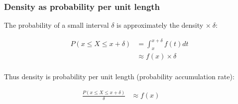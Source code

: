 \documentclass{beamer}
\begin{document}
\begin{frame}
\frametitle{Density as probability per unit length}

The probability of a small interval $\delta$ is approximately the density
$\times \ \delta$:

\vspace{-0.3cm}

\begin{align*}
P(x \leq X \leq x + \delta) &= \int_x^{x+\delta} f(t) dt\\
& \approx f(x) \times \delta\\
\end{align*}

\vspace{-0.5cm}

Thus density is probability per unit length (probability accumulation rate):

\begin{align*}
\frac{P(x \leq X \leq x + \delta)}{\delta} &\approx f(x) \ \ \ \ \ \ \ \ \ \ \ 
\end{align*} 

\end{frame}






\end{document}
